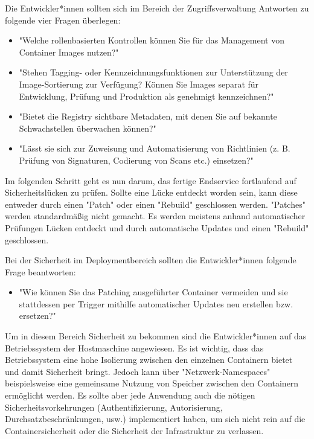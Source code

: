 Die Entwickler*innen sollten sich im Bereich der Zugriffsverwaltung Antworten zu folgende vier Fragen überlegen:

\begin{itemize}
    \item "Welche rollenbasierten Kontrollen können Sie für das Management von Container Images nutzen?" \cite{ContainerSecurity}
    \item "Stehen Tagging- oder Kennzeichnungsfunktionen zur Unterstützung der Image-Sortierung zur Verfügung? Können Sie Images separat für Entwicklung, Prüfung und Produktion als genehmigt kennzeichnen?" \cite{ContainerSecurity}
    \item "Bietet die Registry sichtbare Metadaten, mit denen Sie auf bekannte Schwachstellen überwachen können?" \cite{ContainerSecurity}
    \item "Lässt sie sich zur Zuweisung und Automatisierung von Richtlinien (z. B. Prüfung von Signaturen, Codierung von Scans etc.) einsetzen?" \cite{ContainerSecurity}
\end{itemize}


Im folgenden Schritt geht es nun darum, das fertige Endservice fortlaufend auf Sicherheitslücken zu prüfen. Sollte eine Lücke entdeckt worden sein, kann diese entweder durch einen "Patch" oder einen "Rebuild" geschlossen werden. "Patches" werden standardmäßig nicht gemacht. Es werden meistens anhand automatischer Prüfungen Lücken entdeckt und durch automatische Updates und einen "Rebuild" geschlossen. \cite{ContainerSecurity}

Bei der Sicherheit im Deploymentbereich sollten die Entwickler*innen folgende Frage beantworten:

\begin{itemize}
    \item "Wie können Sie das Patching ausgeführter Container vermeiden und sie stattdessen per Trigger mithilfe automatischer Updates neu erstellen bzw. ersetzen?" \cite{ContainerSecurity}
\end{itemize}

\cite{ContainerSecurity}


Um in diesem Bereich Sicherheit zu bekommen sind die Entwickler*innen auf das Betriebssystem der Hostmaschine angewiesen. Es ist wichtig, dass das Betriebssystem eine hohe Isolierung zwischen den einzelnen Containern bietet und damit Sicherheit bringt. Jedoch kann über "Netzwerk-Namespaces" beispielsweise eine gemeinsame Nutzung von Speicher zwischen den Containern ermöglicht werden. Es sollte aber jede Anwendung auch die nötigen Sicherheitsvorkehrungen (Authentifizierung, Autorisierung, Durchsatzbeschränkungen, usw.) implementiert haben, um sich nicht rein auf die Containersicherheit oder die Sicherheit der Infrastruktur zu verlassen. \cite{ContainerSecurity}


